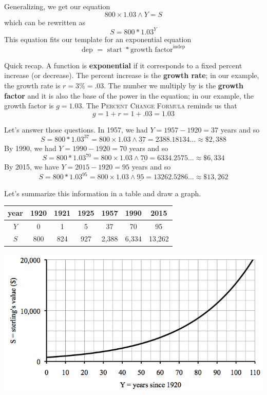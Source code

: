 Generalizing, we get our equation $$800 \times 1.03 \wedge Y= S$$
which can be rewritten as $$S=800 \ast 1.03 ^ Y$$
This equation fits our template for an exponential equation
$$\text{dep }=\text{ start } \ast \text{growth factor}^{\text{indep}}$$

Quick recap.  A function is \textbf{exponential} if it corresponds to a fixed percent increase (or decrease).  The percent increase is the \textbf{growth rate}; in our example, the growth rate is  $r=3\%=.03$.  The number we multiply by is the \textbf{growth factor} and it is also the base of the power in the equation; in our example, the growth factor is $g =  1.03$. The \textsc{Percent Change Formula} reminds us that $$g=1 + r = 1+.03 =1.03$$

Let's answer those questions.  In 1957, we had $Y = 1957 - 1920 = 37$ years and so $$S = 800\ast1.03^{37} = 800 \times 1.03 \wedge \underline{37}= 2388.18134\ldots \approx \$2,388$$
By 1990, we had $Y = 1990 - 1920 = 70$ years and so $$S = 800\ast1.03^{70} = 800 \times 1.03 \wedge \underline{70}= 6334.2575\ldots \approx \$6,334$$
By 2015, we have $Y = 2015 - 1920 = 95$ years and so $$S = 800\ast1.03^{95} = 800 \times 1.03 \wedge \underline{95}= 13262.5286\ldots \approx \$13,262$$

Let's summarize this information in a table and draw a graph.
\begin{center}
\begin{tabular} {|c| |c  |c |c |c |c |c|}\hline
year & 1920 & 1921 & 1925 &  1957 & 1990 & 2015 \\ \hline
$Y$ & 0 & 1 & 5 & 37 & 70 & 95 \\ \hline
$S$ & 800 & 824 & 927 & 2,388 &  6,334  &  13,262 \\ \hline
\end{tabular}
\end{center}
\begin{center}
 {\includegraphics [width = 6in] {GrandmaSterling}}
\end{center}

